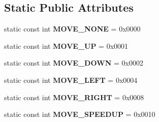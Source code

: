 \subsection*{Static Public Attributes}
\begin{DoxyCompactItemize}
\item 
\hypertarget{class_block_manager_a768886c4d8c4e657e2212d49e204b19a}{static const int {\bfseries M\-O\-V\-E\-\_\-\-N\-O\-N\-E} = 0x0000}\label{class_block_manager_a768886c4d8c4e657e2212d49e204b19a}

\item 
\hypertarget{class_block_manager_a969530de2202f4b42f69e37060bb9a6b}{static const int {\bfseries M\-O\-V\-E\-\_\-\-U\-P} = 0x0001}\label{class_block_manager_a969530de2202f4b42f69e37060bb9a6b}

\item 
\hypertarget{class_block_manager_a59d5bae659415b234359ee927dfd86fe}{static const int {\bfseries M\-O\-V\-E\-\_\-\-D\-O\-W\-N} = 0x0002}\label{class_block_manager_a59d5bae659415b234359ee927dfd86fe}

\item 
\hypertarget{class_block_manager_afd6b587b8a0b45b915adb975c87a432e}{static const int {\bfseries M\-O\-V\-E\-\_\-\-L\-E\-F\-T} = 0x0004}\label{class_block_manager_afd6b587b8a0b45b915adb975c87a432e}

\item 
\hypertarget{class_block_manager_a86a4499f0986b5c17d6af170d4269b0c}{static const int {\bfseries M\-O\-V\-E\-\_\-\-R\-I\-G\-H\-T} = 0x0008}\label{class_block_manager_a86a4499f0986b5c17d6af170d4269b0c}

\item 
\hypertarget{class_block_manager_ac72581c347a0b65de178b4ec85105cfc}{static const int {\bfseries M\-O\-V\-E\-\_\-\-S\-P\-E\-E\-D\-U\-P} = 0x0010}\label{class_block_manager_ac72581c347a0b65de178b4ec85105cfc}

\end{DoxyCompactItemize}
